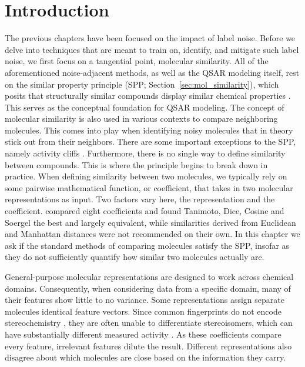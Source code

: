\section{Introduction}

The previous chapters have been focused on the impact of label noise. Before we delve into techniques that are meant to train on, identify, and mitigate such label noise, we first focus on a tangential point, molecular similarity. All of the aforementioned noise-adjacent methods, as well as the QSAR modeling itself, rest on the similar property principle (SPP; Section~\ref{sec:mol_similarity}), which posits that structurally similar compounds display similar chemical properties \citep{Johnson1990}. This serves as the conceptual foundation for QSAR modeling. The concept of molecular similarity is also used in various contexts to compare neighboring molecules. This comes into play when identifying noisy molecules that in theory stick out from their neighbors. There are some important exceptions to the SPP, namely activity cliffs \citep{Stumpfe2012, vanTilborg2022}. Furthermore, there is no single way to define similarity between compounds. This is where the principle begins to break down in practice. When defining similarity between two molecules, we typically rely on some pairwise mathematical function, or coefficient, that takes in two molecular representations as input. Two factors vary here, the representation and the coefficient. \citet{Bajusz2015} compared eight coefficients and found Tanimoto, Dice, Cosine and Soergel the best and largely equivalent, while similarities derived from Euclidean and Manhattan distances were not recommended on their own. In this chapter we ask if the standard methods of comparing molecules satisfy the SPP, insofar as they do not sufficiently quantify how similar two molecules actually are.

General-purpose molecular representations are designed to work across chemical domains. Consequently, when considering data from a specific domain, many of their features show little to no variance. Some representations assign separate molecules identical feature vectors. Since common fingerprints do not encode stereochemistry \citep{orsi2024map4c}, they are often unable to differentiate stereoisomers, which can have substantially different measured activity \citep{Nguyen2006}. As these coefficients compare every feature, irrelevant features dilute the result. Different representations also disagree about which molecules are close based on the information they carry. 

